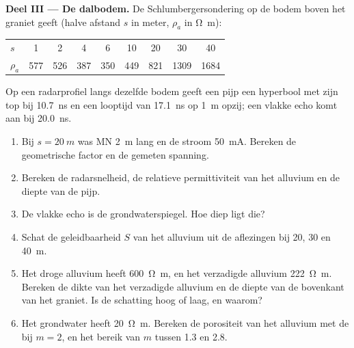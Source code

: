 \begin{problem}
\medskip\noindent\textbf{Deel III --- De dalbodem.} De Schlumbergersondering op de bodem
boven het graniet geeft (halve afstand $s$ in
meter, $\rho_a$ in \unit{\ohm\metre}):
\begin{center}
\small
\begin{tabular}{lcccccccc}
\hline
$s$ & 1 & 2 & 4 & 6 & 10 & 20 & 30 & 40 \\
$\rho_a$ & 577 & 526 & 387 & 350 & 449 & 821 & 1309 & 1684 \\
\hline
\end{tabular}
\end{center}
Op een radarprofiel langs dezelfde bodem geeft een pijp een hyperbool met
zijn top bij \qty{10.7}{ns} en een looptijd van \qty{17.1}{ns} op \qty{1}{m}
opzij; een vlakke echo komt aan bij \qty{20.0}{ns}.
\begin{enumerate}[resume]
\item Bij $s = \qty{20}{m}$ was MN \qty{2}{m} lang en de stroom
  \qty{50}{mA}. Bereken de geometrische factor en de gemeten spanning.
\item Bereken de radarsnelheid, de relatieve permittiviteit van het
  alluvium en de diepte van de pijp.
\item De vlakke echo is de grondwaterspiegel. Hoe diep ligt die?
\item Schat de geleidbaarheid $S$ van het alluvium uit de aflezingen bij
  20, 30 en \qty{40}{m}.
\item Het droge alluvium heeft \qty{600}{\ohm\metre}, en het verzadigde
  alluvium \qty{222}{\ohm\metre}. Bereken de dikte van het verzadigde
  alluvium en de diepte van de bovenkant van het graniet. Is de schatting hoog
  of laag, en waarom?
\item Het grondwater heeft \qty{20}{\ohm\metre}. Bereken de porositeit van
  het alluvium met de  bij $m = 2$, en het bereik van $m$
  tussen \num{1.3} en \num{2.8}.
\end{enumerate}


\end{problem}
